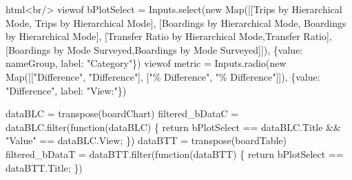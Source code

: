 \documentclass[
  letterpaper,
  DIV=11,
  numbers=noendperiod]{scrreprt}
\newenvironment{Shaded}{\begin{snugshade}}{\end{snugshade}}
\newcommand{\NormalTok}[1]{\textcolor[rgb]{0.00,0.23,0.31}{#1}}
\begin{document}
\begin{Shaded}
\begin{Highlighting}[]
\NormalTok{html\textasciigrave{}\textless{}br/\textgreater{}\textasciigrave{}}
\NormalTok{viewof bPlotSelect = Inputs.select(new Map([[\textquotesingle{}Trips by Hierarchical Mode\textquotesingle{}, \textquotesingle{}Trips by Hierarchical Mode\textquotesingle{}], [\textquotesingle{}Boardings by Hierarchical Mode\textquotesingle{}, \textquotesingle{}Boardings by Hierarchical Mode\textquotesingle{}], [\textquotesingle{}Transfer Ratio by Hierarchical Mode\textquotesingle{},\textquotesingle{}Transfer Ratio\textquotesingle{}], [\textquotesingle{}Boardings by Mode Surveyed\textquotesingle{},\textquotesingle{}Boardings by Mode Surveyed\textquotesingle{}]]), \{value: nameGroup, label: "Category"\})}
\NormalTok{viewof metric = Inputs.radio(new Map([["Difference", "Difference"], ["\% Difference", "\% Difference"]]), \{value: "Difference", label: "View:"\})}

\NormalTok{dataBLC = transpose(boardChart)}
\NormalTok{filtered\_bDataC = dataBLC.filter(function(dataBLC) \{}
\NormalTok{    return bPlotSelect == dataBLC.Title \&\&}
\NormalTok{           "Value" == dataBLC.View;}
\NormalTok{\})}
\NormalTok{dataBTT = transpose(boardTable)}
\NormalTok{filtered\_bDataT = dataBTT.filter(function(dataBTT) \{}
\NormalTok{    return bPlotSelect == dataBTT.Title;}
\NormalTok{\})}
\end{Highlighting}
\end{Shaded}
\end{document}
